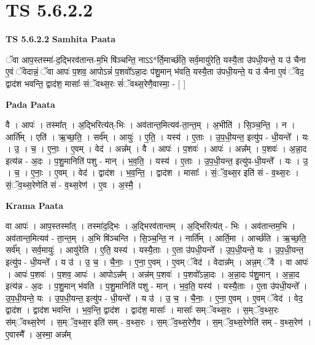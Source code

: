 \documentclass[17pt]{extarticle}
\begin{document}
\section{ TS 5.6.2.2 }

\textbf{TS 5.6.2.2 } \newline
\textbf{Samhita Paata} \newline

ॅवा आप॒स्तस्मा॑-द॒द्भिरव॑तान्त-म॒भि षि॑ञ्चन्ति॒ नाऽऽ*र्ति॒मार्च्छ॑ति॒ सर्व॒मायु॑रेति॒ यस्यै॒ता उ॑पधी॒यन्ते॒ य उ॑ चैना ए॒वं ॅवेदान्नं॒ ॅवा आपः॑ प॒शव॒ आपोऽन्नं॑ प॒शवो᳚ऽन्ना॒दः प॑शु॒मान् भ॑वति॒ यस्यै॒ता उ॑पधी॒यन्ते॒ य उ॑ चैना ए॒वं ॅवेद॒ द्वाद॑श भवन्ति॒ द्वाद॑श॒ मासाः᳚ संॅवथ्स॒रः सं॑ॅवथ्स॒रेणै॒वास्मा॒ - [  ] \newline

\textbf{Pada Paata} \newline

वै । आपः॑ । तस्मा᳚त् । अ॒द्भिरित्य॑त्-भिः । अव॑तान्त॒मित्यव॑-ता॒न्त॒म् । अ॒भीति॑ । सि॒ञ्च॒न्ति॒ । न । आर्ति᳚म् । एति॑ । ऋ॒च्छ॒ति॒ । सर्व᳚म् । आयुः॑ । ए॒ति॒ । यस्य॑ । ए॒ताः । उ॒प॒धी॒यन्त॒ इत्यु॑प - धी॒यन्ते᳚ । यः । उ॒ । च॒ । ए॒नाः॒ । ए॒वम् । वेद॑ । अन्न᳚म् । वै । आपः॑ । प॒शवः॑ । आपः॑ । अन्न᳚म् । प॒शवः॑ । अ॒न्ना॒द इत्य॑न्न - अ॒दः । प॒शु॒मानिति॑ पशु - मान् । भ॒व॒ति॒ । यस्य॑ । ए॒ताः । उ॒प॒धी॒यन्त॒ इत्यु॑प-धी॒यन्ते᳚ । यः । उ॒ । च॒ । ए॒नाः॒ । ए॒वम् । वेद॑ । द्वाद॑श । भ॒व॒न्ति॒ । द्वाद॑श । मासाः᳚ । सं॒ॅव॒थ्स॒र इति॑ सं - व॒थ्स॒रः । सं॒ॅव॒थ्स॒रेणेति॑ सं - व॒थ्स॒रेण॑ । ए॒व । अ॒स्मै॒ ।  \newline


\textbf{Krama Paata} \newline

वा आपः॑ । आप॒स्तस्मा᳚त् । तस्मा॑द॒द्भिः । अ॒द्भिरव॑तान्तम् । अ॒द्भिरित्य॑त् - भिः । अव॑तान्तम॒भि । अव॑तान्त॒मित्यव॑ - ता॒न्त॒म् । अ॒भि षि॑ञ्चन्ति । सि॒ञ्च॒न्ति॒ न । नार्ति᳚म् । आर्ति॒मा । आर्च्छ॑ति । ऋ॒च्छ॒ति॒ सर्व᳚म् । सर्व॒मायुः॑ । आयु॑रेति । ए॒ति॒ यस्य॑ । यस्यै॒ताः । ए॒ता उ॑पधी॒यन्ते᳚ । उ॒प॒धी॒यन्ते॒ यः । उ॒प॒धी॒यन्त॒ इत्यु॑प - धी॒यन्ते᳚ । य उ॑ । उ॒ च॒ । चै॒नाः॒ । ए॒ना॒ ए॒वम् । ए॒वम् ॅवेद॑ । वेदान्न᳚म् । अन्न॒म् ॅवै । वा आपः॑ । आपः॑ प॒शवः॑ । प॒शव॒ आपः॑ । आपोऽन्न᳚म् । अन्न॑म् प॒शवः॑ । प॒शवो᳚ऽन्ना॒दः । अ॒न्ना॒दः प॑शु॒मान् । अ॒न्ना॒द इत्य॑न्न - अ॒दः । प॒शु॒मान् भ॑वति । प॒शु॒मानिति॑ पशु - मान् । भ॒व॒ति॒ यस्य॑ । यस्यै॒ताः । ए॒ता उ॑पधी॒यन्ते᳚ । उ॒प॒धी॒यन्ते॒ यः । उ॒प॒धी॒यन्त॒ इत्यु॑प - धी॒यन्ते᳚ । य उ॑ । उ॒ च॒ । चै॒नाः॒ । ए॒ना॒ ए॒वम् । ए॒वम् ॅवेद॑ । वेद॒ द्वाद॑श । द्वाद॑श भवन्ति । भ॒व॒न्ति॒ द्वाद॑श । द्वाद॑श॒ मासाः᳚ । मासाः᳚ सम्ॅवथ्स॒रः । स॒म्ॅव॒थ्स॒रः स॑म्ॅवथ्स॒रेण॑ । स॒म्ॅव॒थ्स॒र इति॑ सम् - व॒थ्स॒रः । स॒म्ॅव॒थ्स॒रेणै॒व । स॒म्ॅव॒थ्स॒रेणेति॑ सम् - व॒थ्स॒रेण॑ । ए॒वास्मै᳚ । अ॒स्मा॒ अन्न᳚म् \newline
\end{document}
